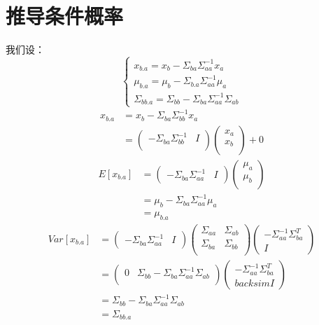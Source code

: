\documentclass{report}
\begin{document}
\section{推导条件概率}
我们设：
$$
\begin{cases}
x_{b.a}=x_b - \Sigma_{ba} \Sigma_{aa}^{-1} x_a \\
\mu_{b.a} = \mu_b - \Sigma_{b.a} \Sigma_{aa}^{-1} \mu_a \\
\Sigma_{bb.a}=\Sigma_{bb} - \Sigma_{ba} \Sigma_{aa}^{-1} \Sigma_{ab}
\end{cases}
$$
$$
\begin{aligned}
x_{b.a} &= x_b - \Sigma_{ba} \Sigma_{bb}^{-1} x_a \\
&=
\left (
\begin{matrix}
- \Sigma_{ba} \Sigma_{bb}^{-1} & I\\
\end{matrix}
\right )
\left (
\begin{matrix}
x_a \\
x_b \\
\end{matrix}
\right ) + 0
\end{aligned}
$$
$$
\begin{aligned}
E[x_{b.a}]
&=
\left (
\begin{matrix}
-\Sigma_{ba} \Sigma_{aa}^{-1} & I
\end{matrix}
\right )
\left (
\begin{matrix}
\mu_a \\
\mu_b \\
\end{matrix}
\right )\\
&=\mu_b - \Sigma_{ba} \Sigma_{aa}^{-1} \mu_a\\
&=\mu_{b.a}
\end{aligned}
$$
$$
\begin{aligned}
Var[x_{b.a}]
&= \left ( \begin{matrix}
-\Sigma_{ba} \Sigma_{aa}^{-1} & I
\end{matrix} \right )
\left ( \begin{matrix}
\Sigma_{aa} & \Sigma_{ab} \\
\Sigma_{ba} & \Sigma_{bb} \\
\end{matrix} \right )
\left ( \begin{matrix}
-\Sigma_{aa}^{-1} \Sigma_{ba}^T \\
I
\end{matrix} \right ) \\
&=\left ( \begin{matrix}
0 & \Sigma_{bb} - \Sigma_{ba} \Sigma_{aa}^{-1} \Sigma_{ab} \\
\end{matrix} \right ) 
\left ( \begin{matrix}
-\Sigma_{aa}^{-1} \Sigma_{ba}^T \\backsim
I
\end{matrix} \right ) \\
&=\Sigma_{bb} - \Sigma_{ba} \Sigma_{aa}^{-1} \Sigma_{ab}\\
&=\Sigma_{bb.a}
\end{aligned}
$$
\end{document}
